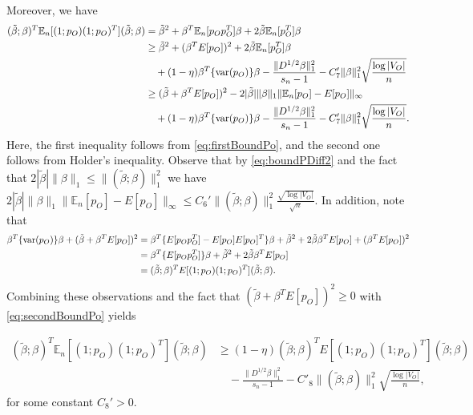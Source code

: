 \documentclass[opre,nonblindrev]{informs3} %
\def\En{{\mathbb{E}_n}}
\begin{document}
\begin{APPENDIX}{}
Moreover, we have
\begin{equation} \label{eq:secondBoundPo}
\begin{aligned}
(\tilde \beta; \beta)^T \En[(1;p_O)  (1;p_O)^T](\tilde \beta;\beta) &= \tilde \beta^2 + \beta^T\En[p_Op_O^T]\beta+2\tilde \beta \En[p_O^T]\beta\\
& \geq \tilde \beta^2 + (\beta^TE[p_O])^2 +2\tilde \beta \En[p_O^T]\beta \\
& \quad+  (1-\eta)\beta^T\{{\rm var}(p_O)\}\beta
- \frac{\|D^{1/2}\beta\|_1^2}{s_n-1}
-C'_7\|\beta\|_1^2\sqrt{\frac{\log |V_O|}{n}}\\
& \geq
(\tilde \beta +\beta^TE[p_O])^2 -2 |\tilde \beta| \|\beta\|_1\|\En[p_O]-E[p_O]\|_\infty \\
&\quad +
(1-\eta)\beta^T\{{\rm var}(p_O)\}\beta
- \frac{\|D^{1/2}\beta\|_1^2}{s_n-1}
-C'_7\|\beta\|_1^2\sqrt{\frac{\log |V_O|}{n}}.
\end{aligned}
\end{equation}
Here, the first inequality follows from \eqref{eq:firstBoundPo}, and the second one follows from Holder's inequality.
Observe that  by \eqref{eq:boundPDiff2}
and the fact that
$2|\tilde \beta|\|\beta\|_1 \leq \|(\tilde \beta; \beta)\|_1^2$
we have
$2 |\tilde \beta| \|\beta\|_1\|\En[p_O]-E[p_O]\|_\infty
\leq C_6'   \| (\tilde{\beta}; \beta) \|_1^2 \frac{\sqrt{\log |V_O|}}{\sqrt{n}}
$.
In addition, note that
\begin{equation}
\begin{aligned}
\beta^T\{{\rm var}(p_O)\}\beta +(\tilde \beta +\beta^TE[p_O])^2 &=
\beta^T\{E[p_O p_O^T] - E[p_O]E[p_O]^T\}\beta
+ \tilde{\beta}^2 + 2 \tilde{\beta} \beta^TE[p_O] +(\beta^TE[p_O])^2\\
&= \beta^T\{E[p_O p_O^T]\}\beta+
\tilde{\beta}^2 + 2 \tilde{\beta} \beta^TE[p_O]\\
&=(\tilde \beta;\beta)^TE[(1;p_O)(1;p_O)^T](\tilde \beta;\beta).
\end{aligned}
\end{equation}
Combining these observations and the fact that
$(\tilde \beta +\beta^TE[p_O])^2\geq 0$ with  \eqref{eq:secondBoundPo} yields

\begin{equation} \label{eq:thirdBoundPo}
\begin{aligned}
(\tilde \beta; \beta)^T \En[(1;p_O)  (1;p_O)^T](\tilde \beta;\beta)
&\geq
(1-\eta) (\tilde \beta;\beta)^TE[(1;p_O)(1;p_O)^T](\tilde \beta;\beta) \\
&\quad
- \frac{\|D^{1/2}\beta\|_1^2}{s_n-1}
-C'_8\|(\tilde \beta;\beta)\|_1^2\sqrt{\frac{\log |V_O|}{n}},
\end{aligned}
\end{equation}
for some constant $C_8'>0$.


\end{APPENDIX}
\end{document}

